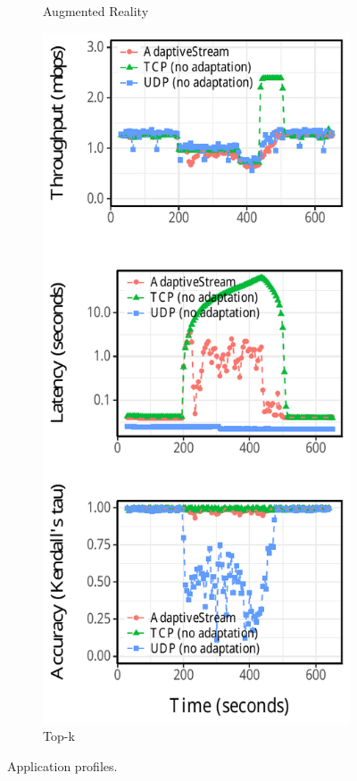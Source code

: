 \begin{figure}[!htb]
\begin{subfigure}[t]{0.3\textwidth}
    \caption{Augmented Reality}
    \label{fig:ar-runtime}
  \end{subfigure}
  \hfill
  \begin{subfigure}[t]{0.3\textwidth}
    \includegraphics[width=\textwidth]{figures/runtime-topk-verticle.pdf}
    \caption{Top-k}
    \label{fig:tk-runtime}
  \end{subfigure}
  \caption{Application profiles.}
  \label{fig:all-runtime}
\end{figure}

